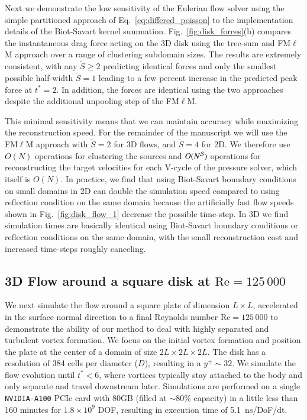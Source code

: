 \documentclass[final,1p,times]{elsarticle}
\begin{document}

Next we demonstrate the low sensitivity of the Eulerian flow solver using the simple partitioned approach of Eq.~\ref{eq:differed_poisson} to the implementation details of the Biot-Savart kernel summation. Fig.~\ref{fig:disk_forces}(b) compares the instantaneous drag force acting on the 3D disk using the tree-sum and FM$\ell$M approach over a range of clustering subdomain sizes. The results are extremely consistent, with any $\tilde S \ge 2$ predicting identical forces and only the smallest possible half-width $\tilde S=1$ leading to a few percent increase in the predicted peak force at $t^*=2$. In addition, the forces are identical using the two approaches despite the additional unpooling step of the FM$\ell$M.

This minimal sensitivity means that we can maintain accuracy while maximizing the reconstruction speed. For the remainder of the manuscript we will use the FM$\ell$M approach with $\tilde S = 2$ for 3D flows, and $\tilde S = 4$ for 2D. We therefore use $O(N)$ operations for clustering the sources and $O(N^{\cal S})$ operations for reconstructing the target velocities for each V-cycle of the pressure solver, which itself is $O(N)$. In practice, we find that using Biot-Savart boundary conditions on small domains in 2D can double the simulation speed compared to using reflection condition on the same domain because the artificially fast flow speeds shown in Fig.~\ref{fig:disk_flow_1} decrease the possible time-step. In 3D we find simulation times are basically identical using Biot-Savart boundary conditions or reflection conditions on the same domain, with the small reconstruction cost and increased time-steps roughly canceling.

\subsection{3D Flow around a square disk at $\text{Re}=125\,000$}

We next simulate the flow around a square plate of dimension $L\times L$, accelerated in the surface normal direction to a final Reynolds number $\text{Re}=125\,000$ to demonstrate the ability of our method to deal with highly separated and turbulent vortex formation. We focus on the initial vortex formation and position the plate at the center of a domain of size $2L\times2L\times2L$. The disk has a resolution of 384 cells per diameter ($D$), resulting in a $y^+\sim 32$. We simulate the flow evolution until $t^*<6$, where vortices typically stay attached to the body and only separate and travel downstream later. Simulations are performed on a single \texttt{NVIDIA-A100} PCIe card with 80GB (filled at $\sim80\%$ capacity) in a little less than 160 minutes for $1.8\times10^9$ DOF, resulting in execution time of 5.1~ns/DoF/dt.
\end{document}
